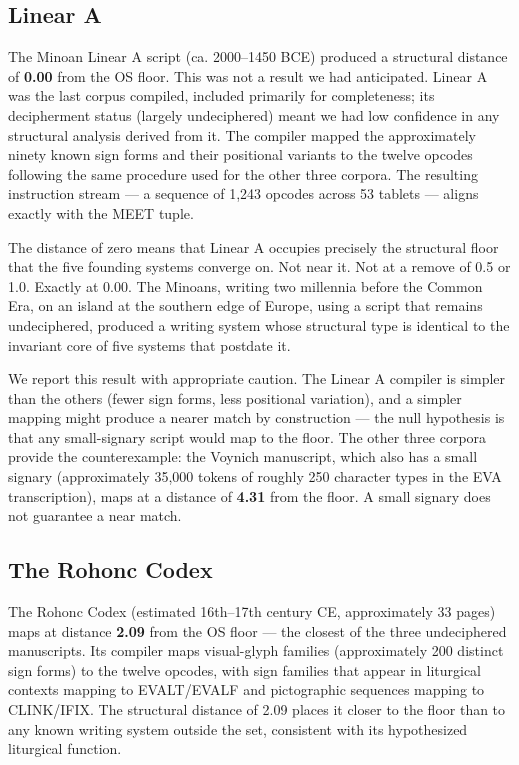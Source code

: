 \documentclass[12pt,a4paper]{article}
\begin{document}
\subsection{Linear A}

The Minoan Linear A script (ca. 2000--1450 BCE) produced a structural distance of \textbf{0.00} from the OS floor. This was not a result we had anticipated. Linear A was the last corpus compiled, included primarily for completeness; its decipherment status (largely undeciphered) meant we had low confidence in any structural analysis derived from it. The compiler mapped the approximately ninety known sign forms and their positional variants to the twelve opcodes following the same procedure used for the other three corpora. The resulting instruction stream --- a sequence of 1,243 opcodes across 53 tablets --- aligns exactly with the MEET tuple.

The distance of zero means that Linear A occupies precisely the structural floor that the five founding systems converge on. Not near it. Not at a remove of 0.5 or 1.0. Exactly at 0.00. The Minoans, writing two millennia before the Common Era, on an island at the southern edge of Europe, using a script that remains undeciphered, produced a writing system whose structural type is identical to the invariant core of five systems that postdate it.

We report this result with appropriate caution. The Linear A compiler is simpler than the others (fewer sign forms, less positional variation), and a simpler mapping might produce a nearer match by construction --- the null hypothesis is that any small-signary script would map to the floor. The other three corpora provide the counterexample: the Voynich manuscript, which also has a small signary (approximately 35,000 tokens of roughly 250 character types in the EVA transcription), maps at a distance of \textbf{4.31} from the floor. A small signary does not guarantee a near match.

\subsection{The Rohonc Codex}

The Rohonc Codex (estimated 16th--17th century CE, approximately 33 pages) maps at distance \textbf{2.09} from the OS floor --- the closest of the three undeciphered manuscripts. Its compiler maps visual-glyph families (approximately 200 distinct sign forms) to the twelve opcodes, with sign families that appear in liturgical contexts mapping to EVALT/EVALF and pictographic sequences mapping to CLINK/IFIX. The structural distance of 2.09 places it closer to the floor than to any known writing system outside the set, consistent with its hypothesized liturgical function.
\end{document}
